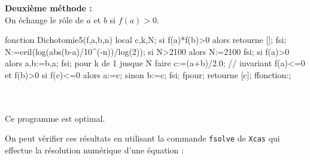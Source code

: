 \documentclass[12pt,a4paper]{book}
\begin{document}
\begin{giacjshere}
{\bf Deuxi\`eme m\'ethode :}\\
On \'echange le r\^ole de $a$ et $b$ si $f(a)>0$.
\begin{giacprog}
fonction Dichotomie5(f,a,b,n)
 local c,k,N;
 si f(a)*f(b)>0 alors retourne []; fsi; 
 N:=ceil(log(abs(b-a)/10^(-n))/log(2)); 
 si N>2100 alors N:=2100 fsi;
 si f(a)>0 alors a,b:=b,a; fsi;
 pour k de 1 jusque N faire
   c:=(a+b)/2.0; // invariant f(a)<=0 et f(b)>0
   si f(c)<=0 alors a:=c; sinon b:=c; fsi;
 fpour;
 retourne [c];
ffonction:;
\end{giacprog}
\\
\\
Ce programme est optimal.

On peut v\'erifier ces r\'esultats en utilisant la commande {\tt fsolve} de 
{\tt Xcas} qui effectue la r\'esolution num\'erique d'une \'equation :\\


\end{giacjshere}
\end{document}
